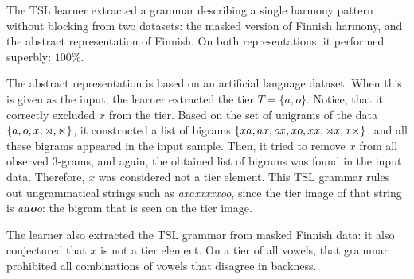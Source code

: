 The TSL learner extracted a grammar describing a single harmony pattern without blocking from two datasets: the masked version of Finnish harmony, and the abstract representation of Finnish.
On both representations, it performed superbly: $100$\%.

The abstract representation is based on an artificial language dataset.
When this is given as the input, the learner extracted the tier $T = \{a, o\}$.
Notice, that it correctly excluded $x$ from the tier.
Based on the set of unigrams of the data $\{a, o, x, \rtimes, \ltimes\}$, it constructed a list of bigrams $\{xa, ax, ox, xo, xx, \rtimes x, x\ltimes\}$, and all these bigrams appeared in the input sample.
Then, it tried to remove $x$ from all observed $3$-grams, and again, the obtained list of bigrams was found in the input data.
Therefore, $x$ was considered not a tier element.
This TSL grammar rules out ungrammatical strings such as \emph{axaxxxxxoo}, since the tier image of that string is \emph{a\textbf{ao}o}: the bigram that is seen on the tier image.

\begin{table}[h!]
\centering
{}
\caption{TSL learning of a single harmony without blockers; abstract representation.}
\end{table}

The learner also extracted the TSL grammar from masked Finnish data: it also conjectured that $x$ is not a tier element.
On a tier of all vowels, that grammar prohibited all combinations of vowels that disagree in backness.

